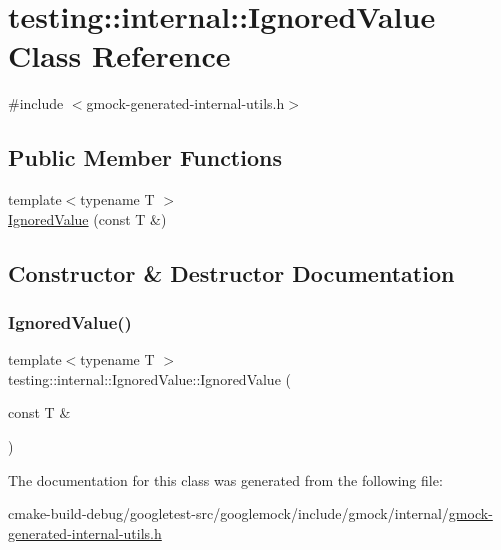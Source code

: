 \hypertarget{classtesting_1_1internal_1_1IgnoredValue}{}\section{testing\+::internal\+::Ignored\+Value Class Reference}
\label{classtesting_1_1internal_1_1IgnoredValue}


{\ttfamily \#include $<$gmock-\/generated-\/internal-\/utils.\+h$>$}

\subsection*{Public Member Functions}
\begin{DoxyCompactItemize}
\item 
{\footnotesize template$<$typename T $>$ }\\\mbox{\hyperlink{classtesting_1_1internal_1_1IgnoredValue_a6c72839c07a9da8d027efb253144bd91}{Ignored\+Value}} (const T \&)
\end{DoxyCompactItemize}


\subsection{Constructor \& Destructor Documentation}
\mbox{\label{classtesting_1_1internal_1_1IgnoredValue_a6c72839c07a9da8d027efb253144bd91}} 
\subsubsection{\texorpdfstring{IgnoredValue()}{IgnoredValue()}}
{\footnotesize\ttfamily template$<$typename T $>$ \\
testing\+::internal\+::\+Ignored\+Value\+::\+Ignored\+Value (\begin{DoxyParamCaption}\item[{const T \&}]{ }\end{DoxyParamCaption})\hspace{0.3cm}{\ttfamily [inline]}}



The documentation for this class was generated from the following file\+:\begin{DoxyCompactItemize}
\item 
cmake-\/build-\/debug/googletest-\/src/googlemock/include/gmock/internal/\mbox{\hyperlink{gmock-generated-internal-utils_8h}{gmock-\/generated-\/internal-\/utils.\+h}}\end{DoxyCompactItemize}
